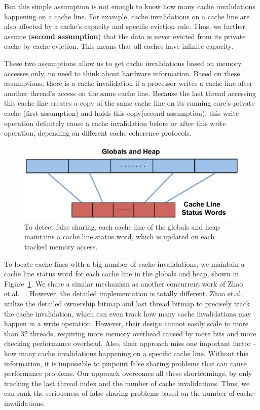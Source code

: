 But this simple assumption is not enough to know how many cache invalidations happening on a cache line. For example, cache invalidations on a cache line are also affected by a cache's capacity and specific eviction rule. Thus, we further assume (\textbf{second assumption}) that the data is never evicted from its private cache by cache eviction. This means that all caches have infinite capacity. 

These two assumptions allow us to get cache invalidations based on memory accesses only, no need to think about hardware information. Based on these assumptions, there is a cache invalidation if a processor writes a cache line after another thread's access on the same cache line. Because the last thread accessing this cache line creates a copy of the same cache line on its running core's private cache (first assumption) and  holds this copy(second assumption), this write operation definitely cause a cache invalidation before or after this write operation, depending on different cache coherence protocols. 


\begin{figure}[!t]
\centering
\includegraphics[width=5in]{fig/cachelinestatuswords}
\caption{
To detect false sharing, each cache line of the globals and heap maintains a cache line status word, which is updated on each tracked memory access. \label{fig:cachelinestatusword}}
\end{figure}


To locate cache lines with a big number of cache invalidations, we maintain a cache line status word for each cache line in the globals and heap, shown in Figure~\ref{fig:cachelinestatusword}. We share a similar mechanism as another concurrent work of Zhao et.al. ~\cite{qinzhao}. 
However, the detailed implementation is totally different. Zhao et.al. utilize the detailed ownership bitmap and last thread bitmap to precisely track the cache invalidation, which can even track how many cache invalidations may happen in a write operation. However, their design cannot easily scale to more than 32 threads, requiring more memory overhead caused by more bits and more checking performance overhead. Also, their approach miss one important factor - how many cache invalidations happening on a specific cache line. Without this information, it is impossible to pinpoint false sharing problems that can cause performance problems.   
Our approach overcomes all these shortcomings, by only tracking the last thread index and the number of cache invalidations. Thus, we can rank the seriousness of false sharing problems based on the number of cache invalidations. 

